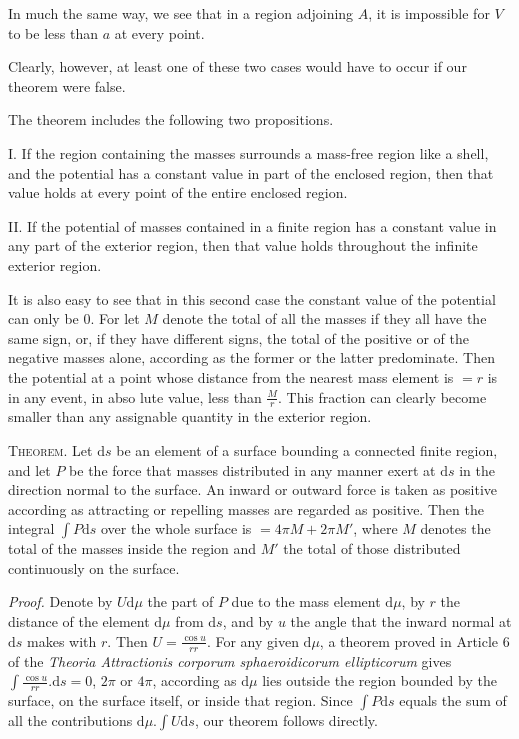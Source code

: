 In much the same way, we see that in a region adjoining $A$, it is impossible for $V$ to be less than $a$ at every point.

Clearly, however, at least one of these two cases would have to occur if our theorem were false.

The theorem includes the following two propositions.

I. If the region containing the masses surrounds a mass-free region like a shell, and the potential has a constant value in part of the enclosed region, then that value holds at every point of the entire enclosed region.

II. If the potential of masses contained in a finite region has a constant value in any part of the exterior region, then that value holds throughout the infinite exterior region.

It is also easy to see that in this second case the constant value of the potential can only be $0$. For let $M$ denote the total of all the masses if they all have the same sign, or, if they have different signs, the total of the positive or of the negative masses alone, according as the former or the latter predominate. Then the potential at a point whose distance from the nearest mass element is $=r$ is in any event, in abso%
%
lute value, less than $\frac Mr$. This fraction can clearly become smaller than any assignable quantity in the exterior region.

\textsc{Theorem.} Let $\mathrm ds$ be an element of a surface bounding a connected finite region, and let $P$ be the force that masses distributed in any manner exert at $\mathrm ds$ in the direction normal to the surface. An inward or outward force is taken as positive according as attracting or repelling masses are regarded as positive. Then the integral $\int P\mathrm ds$ over the whole surface is $=4\pi M+2\pi M'$, where $M$ denotes the total of the masses inside the region and $M'$ the total of those distributed continuously on the surface.

\textit{Proof.} Denote by $U\mathrm d\mu$ the part of $P$ due to the mass element $\mathrm d\mu$, by $r$ the distance of the element $\mathrm d\mu$ from $\mathrm ds$, and by $u$ the angle that the inward normal at $\mathrm ds$ makes with $r$. Then $U=\frac{\cos u}{rr}$. For any given $\mathrm d\mu$, a theorem proved in Article 6 of the \textit{Theoria Attractionis corporum sphaeroidicorum ellipticorum} gives $\int\frac{\cos u}{rr}.\mathrm ds=0$, $2\pi$ or $4\pi$, according as $\mathrm d\mu$ lies outside the region bounded by the surface, on the surface itself, or inside that region. Since $\int P\mathrm ds$ equals the sum of all the contributions $\mathrm d\mu.\int U\mathrm ds$, our theorem follows directly.


